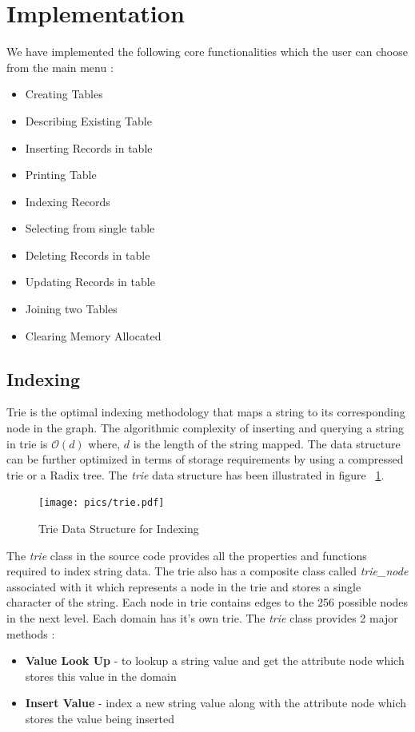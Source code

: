 \documentclass[12pt, oneside]{book}
\begin{document}
\section{Implementation}
We have implemented the following core functionalities which the user can choose from the main menu :
\begin{multicols}{2}
 \begin{itemize}
  \item Creating Tables
  \item Describing Existing Table
  \item Inserting Records in table
  \item Printing Table
  \item Indexing Records
  \item Selecting from single table
  \item Deleting Records in table
  \item Updating Records in table
  \item Joining two Tables
  \item Clearing Memory Allocated
 \end{itemize}
\end{multicols}

\subsection{Indexing}
Trie is the optimal indexing methodology that maps a string to its corresponding node in the graph. The algorithmic complexity of inserting and querying a string in trie is $\mathcal{O} \left( d\right)$ where, $d$ is the length of the string mapped. The data structure can be further optimized in terms of storage requirements by using a compressed trie or a Radix tree. The \emph{trie} data structure has been illustrated in figure ~\ref{fig:trie}.
\begin{figure}
 \centering
 \texttt{[image: pics/trie.pdf]}
 \caption{Trie Data Structure for Indexing}
 \label{fig:trie}
\end{figure}

The \emph{trie} class in the source code provides all the properties and functions required to index string data. The trie also has a composite class called \emph{trie\_node} associated with it which represents a node in the trie and stores a single character of the string. Each node in trie contains edges to the 256 possible nodes in the next level. Each domain has it's own trie. The \emph{trie} class provides 2 major methods :
\begin{itemize}
 \item \textbf{Value Look Up} - to lookup a string value and get the attribute node which stores this value in the domain
 \item \textbf{Insert Value} - index a new string value along with the attribute node which stores the value being inserted
\end{itemize}
\end{document}
